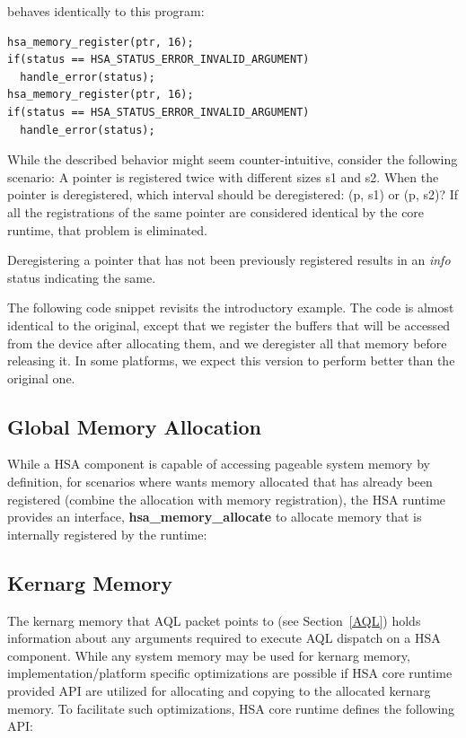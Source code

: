 \documentclass[final]{book}
\newcommand{\reffun}[1]{\textbf{#1}}
\begin{document}
behaves identically to this program:

\begin{lstlisting}
hsa_memory_register(ptr, 16);
if(status == HSA_STATUS_ERROR_INVALID_ARGUMENT)
  handle_error(status);
hsa_memory_register(ptr, 16);
if(status == HSA_STATUS_ERROR_INVALID_ARGUMENT)
  handle_error(status);
\end{lstlisting}

While the described behavior might seem counter-intuitive, consider the
following scenario: A pointer is registered twice with different sizes s1 and
s2. When the pointer is deregistered, which interval should be deregistered: (p,
s1) or (p, s2)? If all the registrations of the same pointer are considered
identical by the core runtime, that problem is eliminated.

Deregistering a pointer that has not been previously registered results in an
\emph{info} status indicating the same.

The following code snippet revisits the introductory example. The code is almost
identical to the original, except that we register the buffers that will be
accessed from the device after allocating them, and we deregister all that
memory before releasing it. In some platforms, we expect this version to perform
better than the original one.


\hypertarget{globalmemory}{}\subsection{Global  Memory Allocation}\label{globalmemory}

While a HSA component is capable of accessing pageable system memory by
definition, for scenarios where wants memory allocated that has already been
registered (combine the allocation with memory registration), the HSA runtime
provides an interface, \reffun{hsa_memory_allocate} to allocate memory that is
internally registered by the runtime:



\hypertarget{kernarg}{}\subsection{Kernarg Memory}\label{kernargmem}

The kernarg memory that AQL packet points to (see Section~\ref{AQL}) holds
information about any arguments required to execute AQL dispatch on a HSA
component. While any system memory may be used for kernarg memory,
implementation/platform specific optimizations are possible if HSA core runtime
provided API are utilized for allocating and copying to the allocated kernarg
memory. To facilitate such optimizations, HSA core runtime defines the following
API:
\end{document}
